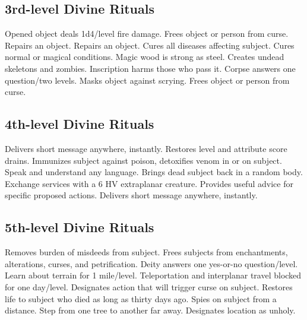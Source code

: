 \subsection{3rd-level Divine Rituals}
\begin{rituallist}
   Opened object deals 1d4/level fire damage.
   Frees object or person from curse.
   Repairs an object.
   Repairs an object.
   Cures all diseases affecting subject.
   Cures normal or magical conditions.
   Magic wood is strong as steel.
   Creates undead skeletons and zombies.
  \M Inscription harms those who pass it.
   Corpse answers one question/two levels.
   Masks object against scrying.
   Frees object or person from curse.
\end{rituallist}

\subsection{4th-level Divine Rituals}
\begin{rituallist}
   Delivers short message anywhere, instantly.
   Restores level and attribute score drains.
   Immunizes subject against poison, detoxifies venom in or on subject.
   Speak and understand any language.
   Brings dead subject back in a random body.
   Exchange services with a 6 HV extraplanar creature.
   Provides useful advice for specific proposed actions.
   Delivers short message anywhere, instantly.
\end{rituallist}

\subsection{5th-level Divine Rituals}
\begin{rituallist}
  \F\M Removes burden of misdeeds from subject.
   Frees subjects from enchantments, alterations, curses, and petrification.
   Deity answers one yes-or-no question/level.
   Learn about terrain for 1 mile/level.
   Teleportation and interplanar travel blocked for one day/level.
   Designates action that will trigger curse on subject.
   Restores life to subject who died as long as thirty days ago.
  \F Spies on subject from a distance.
   Step from one tree to another far away.
   Designates location as unholy.
\end{rituallist}

